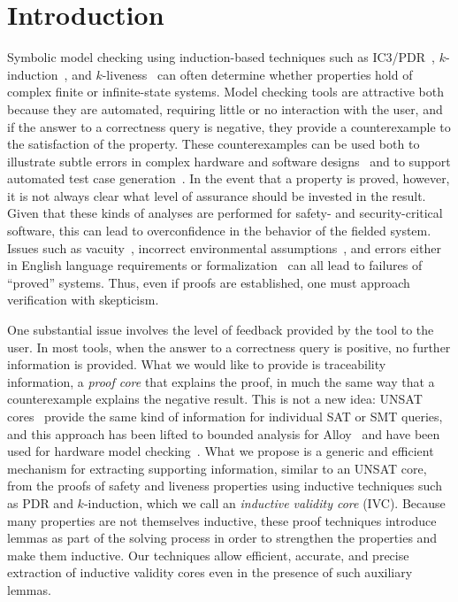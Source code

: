 \section{Introduction}
\label{sec:intro}

Symbolic model checking using induction-based techniques such as IC3/PDR~\cite{Een2011:PDR}, $k$-induction~\cite{SheeranSS00}, and $k$-liveness~\cite{conf/fmcad/ClaessenS12} can often determine whether properties hold of complex finite or infinite-state systems.    Model checking tools are attractive both because they are automated, requiring little or no interaction with the user, and if the answer to a correctness query is negative, they provide a counterexample to the satisfaction of the property.  These counterexamples can be used both to illustrate subtle errors in complex hardware and software designs~\cite{hilt2013,McMillan99:compositional, Miller10:CACM} and to support automated test case generation~\cite{Whalen13:OMCDC, You15:dse}.
In the event that a property is proved, however, it is not always clear what level of assurance should be invested in the result.  Given that these kinds of analyses are performed for safety- and security-critical software, this can lead to overconfidence in the behavior of the fielded system.  Issues such as vacuity~\cite{Kupferman03:Vacuity}, incorrect environmental assumptions~\cite{Whalen07:FMICS}, and errors either in English language requirements or formalization~\cite{Pike06:axioms} can all lead to failures of ``proved'' systems.  Thus, even if proofs are established, one must approach verification with skepticism.

One substantial issue involves the level of feedback provided by the tool to the user. In most tools, when the answer to a correctness query is positive, no further information is provided. What we would like to provide is traceability information, a {\em proof core} that explains the proof, in much the same way that a counterexample explains the
negative result. This is not a new idea: UNSAT cores~\cite{zhang2003extracting} provide the same kind of information for individual SAT or
SMT queries, and this approach has been lifted to bounded analysis
for Alloy~\cite{Torlak08:cores} and have been used for hardware model checking~\cite{jasper_gold}. What we propose is a generic and efficient
mechanism for extracting supporting information, similar to an UNSAT
core, from the proofs of safety and liveness properties using inductive techniques
such as PDR and $k$-induction, which we call an {\em inductive validity core} (IVC). Because many properties are not themselves inductive, these proof techniques introduce lemmas as part of the solving process in order to strengthen the properties and make them inductive. Our techniques allow efficient, accurate, and precise extraction of inductive validity cores even in the presence of such auxiliary lemmas.

